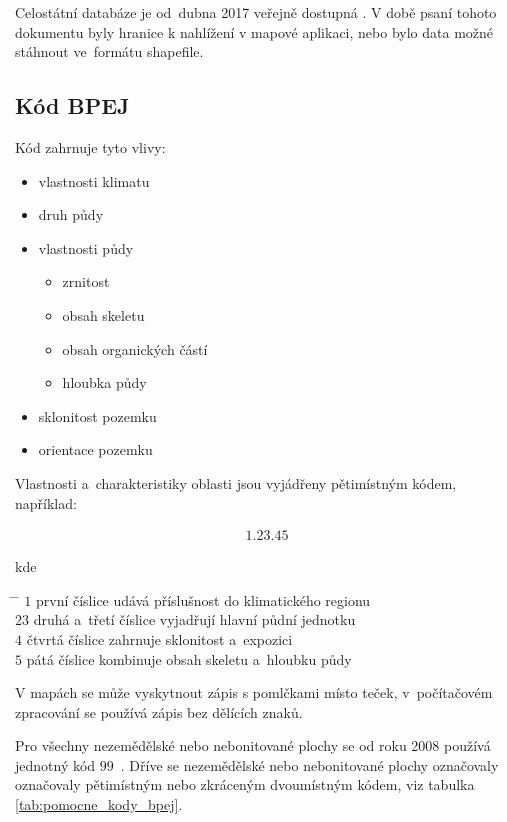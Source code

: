 Celostátní databáze  je od~dubna 2017 veřejně dostupná \citep{databaze_bpej}. V době psaní tohoto dokumentu byly hranice  k nahlížení v mapové aplikaci, nebo bylo data možné stáhnout ve~formátu shapefile.

\subsection{Kód BPEJ}
\label{kod_bpej}

Kód  zahrnuje tyto vlivy:
	\begin{itemize}[leftmargin=1.5cm, noitemsep]
		\item vlastnosti klimatu
		\item druh půdy
		\item vlastnosti půdy
			\begin{itemize}[leftmargin=1cm, noitemsep]
				\item zrnitost
				\item obsah skeletu
				\item obsah organických částí
				\item hloubka půdy
			\end{itemize}
		\item sklonitost pozemku
		\item orientace pozemku
	\end{itemize}

Vlastnosti a~charakteristiky oblasti  jsou vyjádřeny pětimístným kódem, například:

\begin{align*}
	1.23.45
\end{align*}

kde
\begin{tabbing}
\hspace{2em} \= \hspace{5em} \= \kill
	\> $1$	\> první číslice udává příslušnost do klimatického regionu \\
	\> $23$	\> druhá a~třetí číslice vyjadřují hlavní půdní jednotku \\
	\> $4$	\> čtvrtá číslice zahrnuje sklonitost a~expozici\\
	\> $5$	\> pátá číslice kombinuje obsah skeletu a~hloubku půdy
\end{tabbing}

V mapách se může vyskytnout zápis s pomlčkami místo teček, v~počítačovém zpracování se používá zápis bez dělících znaků.

Pro všechny nezemědělské nebo nebonitované plochy se od roku 2008 používá jednotný kód $99$~\citep{metodika_bpej}. Dříve se nezemědělské nebo nebonitované plochy označovaly označovaly pětimístným nebo zkráceným dvoumístným kódem, viz tabulka \ref{tab:pomocne_kody_bpej}.

